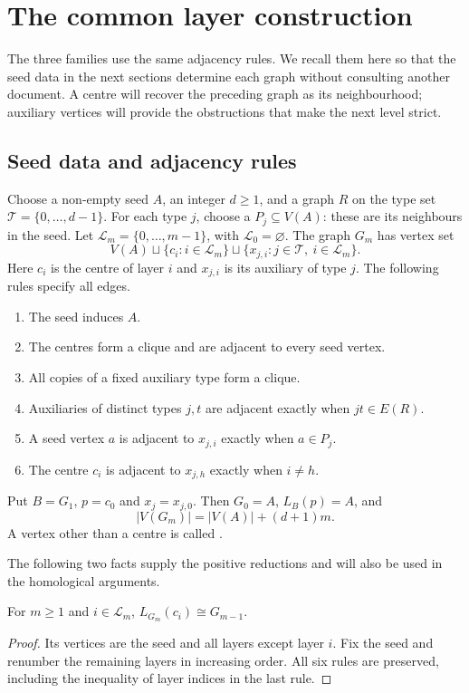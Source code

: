 \section{The common layer construction}\label{sec:construction}
The three families use the same adjacency rules. We recall them here so that
the seed data in the next sections determine each graph without consulting
another document. A centre will recover the preceding graph as its
neighbourhood; auxiliary vertices will provide the obstructions that make
the next level strict.

\subsection{Seed data and adjacency rules}
Choose a non-empty seed $A$, an integer $d\geq1$, and a graph $R$ on the
type set $\mathcal T=\{0,\ldots,d-1\}$. For each type $j$, choose a
 $P_j\subseteq V(A)$: these are its neighbours in the seed.
Let $\mathcal L_m=\{0,\ldots,m-1\}$, with $\mathcal L_0=\varnothing$.
The graph $G_m$ has vertex set
\[
 V(A)\sqcup\{c_i:i\in\mathcal L_m\}
 \sqcup\{x_{j,i}:j\in\mathcal T,\ i\in\mathcal L_m\}.
\]
Here $c_i$ is the centre of layer $i$ and $x_{j,i}$ is its auxiliary of type $j$.
The following rules specify all edges.
\begin{enumerate}
\item The seed induces $A$.
\item The centres form a clique and are adjacent to every seed vertex.
\item All copies of a fixed auxiliary type form a clique.
\item Auxiliaries of distinct types $j,t$ are adjacent exactly when $jt\in E(R)$.
\item A seed vertex $a$ is adjacent to $x_{j,i}$ exactly when $a\in P_j$.
\item The centre $c_i$ is adjacent to $x_{j,h}$ exactly when $i\ne h$.
\end{enumerate}
Put $B=G_1$, $p=c_0$ and $x_j=x_{j,0}$. Then $G_0=A$, $L_B(p)=A$, and
\begin{equation}\label{eq:general-order}
 |V(G_m)|=|V(A)|+(d+1)m.
\end{equation}
A vertex other than a centre is called .

The following two facts supply the positive reductions and will also be used
in the homological arguments.
\begin{lemma}\label{lem:centre}
For $m\geq1$ and $i\in\mathcal L_m$, $L_{G_m}(c_i)\cong G_{m-1}$.
\end{lemma}
\begin{proof}
Its vertices are the seed and all layers except layer $i$. Fix the seed and
renumber the remaining layers in increasing order. All six rules are
preserved, including the inequality of layer indices in the last rule.
\end{proof}

